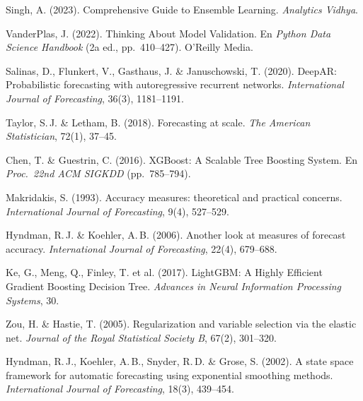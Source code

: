 \documentclass[12pt, letterpaper]{article}
\begin{document}
\begin{enumerate}[label={[\arabic*]}, leftmargin=*, noitemsep]
    \item Singh, A. (2023). Comprehensive Guide to Ensemble Learning. \textit{Analytics Vidhya}.

    \item VanderPlas, J. (2022). Thinking About Model Validation. En \textit{Python Data Science Handbook} (2a ed., pp.~410--427). O'Reilly Media.

    \item Salinas, D., Flunkert, V., Gasthaus, J. \& Januschowski, T. (2020). DeepAR: Probabilistic forecasting with autoregressive recurrent networks. \textit{International Journal of Forecasting}, 36(3), 1181--1191.

    \item Taylor, S.\,J. \& Letham, B. (2018). Forecasting at scale. \textit{The American Statistician}, 72(1), 37--45.

    \item Chen, T. \& Guestrin, C. (2016). XGBoost: A Scalable Tree Boosting System. En \textit{Proc.\ 22nd ACM SIGKDD} (pp.~785--794).

    \item Makridakis, S. (1993). Accuracy measures: theoretical and practical concerns. \textit{International Journal of Forecasting}, 9(4), 527--529.

    \item Hyndman, R.\,J. \& Koehler, A.\,B. (2006). Another look at measures of forecast accuracy. \textit{International Journal of Forecasting}, 22(4), 679--688.

    \item Ke, G., Meng, Q., Finley, T. et al. (2017). LightGBM: A Highly Efficient Gradient Boosting Decision Tree. \textit{Advances in Neural Information Processing Systems}, 30.

    \item Zou, H. \& Hastie, T. (2005). Regularization and variable selection via the elastic net. \textit{Journal of the Royal Statistical Society B}, 67(2), 301--320.

    \item Hyndman, R.\,J., Koehler, A.\,B., Snyder, R.\,D. \& Grose, S. (2002). A state space framework for automatic forecasting using exponential smoothing methods. \textit{International Journal of Forecasting}, 18(3), 439--454.
\end{enumerate}

\newpage
\end{document}

